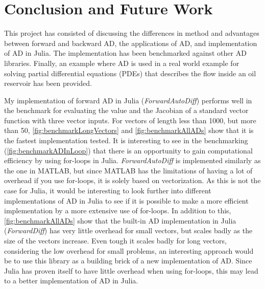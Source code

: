 \chapter{Conclusion and Future Work}
\label{ch:Conclusion}
This project has consisted of discussing the differences in method and advantages between forward and backward AD, the applications of AD, and implementation of AD in Julia. The implementation has been benchmarked against other AD libraries. Finally, an example where AD is used in a real world example for solving partial differential equations (PDEs) that describes the flow inside an oil reservoir has been provided.

My implementation of forward AD in Julia (\textit{ForwardAutoDiff}) performs well in the benchmark for evaluating the value and the Jacobian of a standard vector function with three vector inputs. For vectors of length less than 1000, but more than 50, \autoref{fig:benchmarkLongVectors} and \autoref{fig:benchmarkAllADs} show that it is the fastest implementation tested. It is interesting to see in the benchmarking (\autoref{fig:benchmarkADInLoop}) that there is an opportunity to gain computational efficiency by using for-loops in Julia. \textit{ForwardAutoDiff} is implemented similarly as the one in MATLAB, but since MATLAB has the limitations of having a lot of overhead if you use for-loops, it is solely based on vectorization. As this is not the case for Julia, it would be interesting to look further into different implementations of AD in Julia to see if it is possible to make a more efficient implementation by a more extensive use of for-loops. In addition to this, \autoref{fig:benchmarkAllADs} show that the built-in AD implementation in Julia (\textit{ForwardDiff}) has very little overhead for small vectors, but scales badly as the size of the vectors increase. Even tough it scales badly for long vectors, considering the low overhead for small problems, an interesting approach would be to use this library as a building brick of a new implementation of AD. Since Julia has proven itself to have little overhead when using for-loops, this may lead to a better implementation of AD in Julia.

